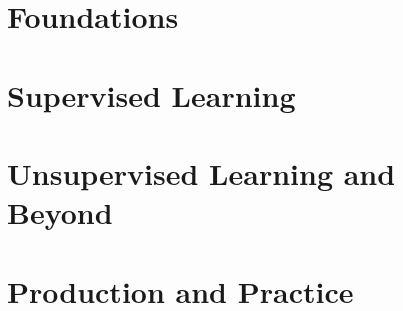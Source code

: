 



\maketitle
\tableofcontents

\part{Foundations}





\part{Supervised Learning}







\part{Unsupervised Learning and Beyond}






\part{Production and Practice}






\appendix






